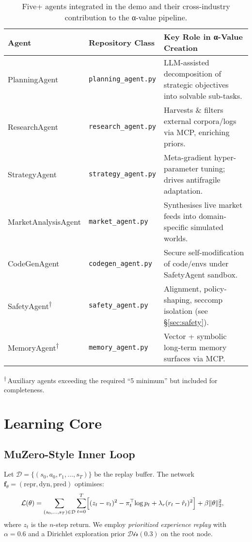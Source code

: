 \documentclass[11pt]{article}
\begin{document}
\begin{table}[ht]\centering
\caption{Five+ agents integrated in the demo and their cross-industry
contribution to the α-value pipeline.}
\label{tab:agents}
\begin{tabular}{@{}lll@{}}
\toprule
\textbf{Agent} & \textbf{Repository Class} & \textbf{Key Role in α-Value Creation}\\
\midrule
PlanningAgent & \texttt{planning\_agent.py} &
LLM-assisted decomposition of strategic objectives into solvable sub-tasks.\\
ResearchAgent & \texttt{research\_agent.py} &
Harvests \& filters external corpora/logs via MCP, enriching priors.\\
StrategyAgent & \texttt{strategy\_agent.py} &
Meta-gradient hyper-parameter tuning; drives antifragile adaptation.\\
MarketAnalysisAgent & \texttt{market\_agent.py} &
Synthesises live market feeds into domain-specific simulated worlds.\\
CodeGenAgent & \texttt{codegen\_agent.py} &
Secure self-modification of code/envs under SafetyAgent sandbox.\\
SafetyAgent\textsuperscript{†} & \texttt{safety\_agent.py} &
Alignment, policy-shaping, seccomp isolation (see §\ref{sec:safety}).\\
MemoryAgent\textsuperscript{†} & \texttt{memory\_agent.py} &
Vector + symbolic long-term memory surfaces via MCP.\\
\bottomrule
\end{tabular}

\vspace{0.4em}
\footnotesize\textsuperscript{†}\,Auxiliary agents exceeding the required
“5 minimum” but included for completeness.
\end{table}

\section{Learning Core}

\subsection{MuZero-Style Inner Loop}

Let $\mathcal{D} = \{(s_0,a_0,r_1,\dots,s_T)\}$ be the replay buffer.  
The network $\mathbf{f}_\theta = (\mathrm{repr},\mathrm{dyn},\mathrm{pred})$
optimises:
\begin{align}
\mathcal{L}(\theta) &=
\sum_{(s_0,\dots,s_T)\in\mathcal{D}}
\sum_{t=0}^{T}
\Bigl[
  (z_t - v_t)^2
  -\pi_t^\top \!\log p_t
  + \lambda_r (r_t - \hat r_t)^2
\Bigr]
+ \beta \lVert\theta\rVert_2^2 ,
\end{align}
where $z_t$ is the $n$-step return.  We employ
\emph{prioritized experience replay} with $\alpha=0.6$ and a
Dirichlet exploration prior $\mathcal{Dir}(0.3)$ on the root node.
\end{document}
